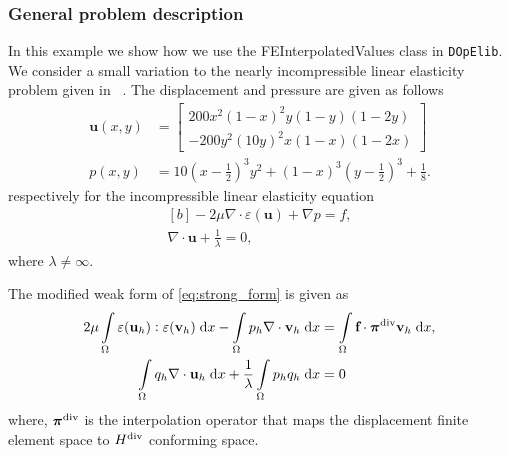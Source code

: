 \subsubsection{General problem description}
 In this example we show how we use the FEInterpolatedValues class in \texttt{DOpElib}.
 We consider a small variation to the nearly incompressible linear elasticity problem given 
 in ~\cite{Linke:2014}. The displacement and pressure are given as follows
 \begin{align*}
   \textbf{u}(x, y) & = \begin{bmatrix}
 		    200 x^2 (1-x)^2y(1-y)(1-2y) \\
 		    -200 y^2(10y)^2x(1-x)(1-2x)
 	  	   \end{bmatrix} \\
   p(x,y) & = 10\left(x - \frac{1}{2}\right)^3y^2 + (1-x)^3\left(y-\frac{1}{2}\right)^3 + \frac{1}{8}.
 \end{align*}
 respectively for the incompressible linear elasticity equation
 \begin{equation}
   \begin{aligned}[b] \label{eq:strong_form}
     -2\mu \nabla \! \cdot \! \varepsilon(\textbf{u}) + \nabla p = f, \\
     \nabla \cdot \textbf{u} + \frac{1}{\lambda} = 0,
   \end{aligned}
 \end{equation}
 where $\lambda \neq \infty$.
 
 The modified weak form of \eqref{eq:strong_form} is given as
  \begin{align}
   2\mu \int\limits_\Omega \varepsilon(\textbf{u}_h) : \varepsilon(\textbf{v}_h) \; \mathrm{d} x - 
   \int\limits_\Omega p_h \nabla \cdot \textbf{v}_h \; \mathrm{d} x & = \int\limits_\Omega \textbf{f} \cdot  \bm{\pi}^{\rm{div}} \textbf{v}_h \; \mathrm{d} x  \label{eq:modified_weak_form} , \\
   \int\limits_\Omega q_h \nabla \cdot \textbf{u}_h \; \mathrm{d} x  + \dfrac{1}{\lambda}\int\limits_\Omega p_hq_h \; \mathrm{d} x  & = 0  \label{eq:nearly_incompress_modified}
 \end{align}
 where, $\bm{\pi}^{\rm{div}}$ is the interpolation operator that maps the displacement finite element space 
 to $H^{\rm{div}}$ conforming space.

